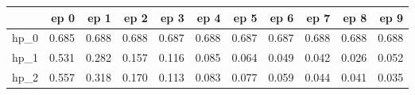 \begin{tabular}{lrrrrrrrrrr}
\toprule
{} &   ep 0 &   ep 1 &   ep 2 &   ep 3 &   ep 4 &   ep 5 &   ep 6 &   ep 7 &   ep 8 &   ep 9 \\
\midrule
hp\_0 &  0.685 &  0.688 &  0.688 &  0.687 &  0.688 &  0.687 &  0.687 &  0.688 &  0.688 &  0.688 \\
hp\_1 &  0.531 &  0.282 &  0.157 &  0.116 &  0.085 &  0.064 &  0.049 &  0.042 &  0.026 &  0.052 \\
hp\_2 &  0.557 &  0.318 &  0.170 &  0.113 &  0.083 &  0.077 &  0.059 &  0.044 &  0.041 &  0.035 \\
\bottomrule
\end{tabular}
